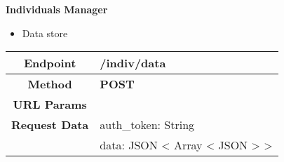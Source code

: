     \textbf{Individuals Manager}
    \begin{itemize}
        \item Data store
    \end{itemize}
    \begin{adjustwidth}{1cm}{}
        \begin{longtable}{|c|l|}
            \hline
            \textbf{Endpoint} & /indiv/data \\
            \hline
            \textbf{Method} & \textbf{POST} \\
            \hline
            \textbf{URL Params} &  \\
            \hline
            \textbf{Request Data} & auth\_token: String \\
            &                 data: JSON < Array < JSON > > \\
            

\end{longtable}
\end{adjustwidth}
